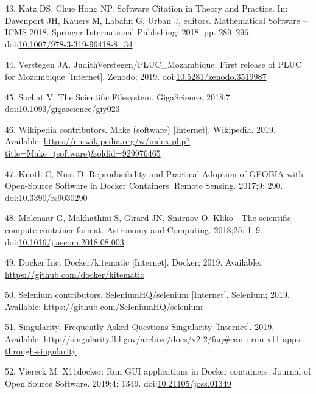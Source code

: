 \documentclass[10pt,letterpaper]{article}
\begin{document}
\leavevmode\hypertarget{ref-katz_software_2018}{}%
43. Katz DS, Chue Hong NP. Software Citation in Theory and Practice. In:
Davenport JH, Kauers M, Labahn G, Urban J, editors. Mathematical
Software -- ICMS 2018. Springer International Publishing; 2018. pp.
289--296.
doi:\href{https://doi.org/10.1007/978-3-319-96418-8_34}{10.1007/978-3-319-96418-8\_34}

\leavevmode\hypertarget{ref-verstegen_pluc_mozambique_2019}{}%
44. Verstegen JA. JudithVerstegen/PLUC\_Mozambique: First release of
PLUC for Mozambique {[}Internet{]}. Zenodo; 2019.
doi:\href{https://doi.org/10.5281/zenodo.3519987}{10.5281/zenodo.3519987}

\leavevmode\hypertarget{ref-sochat_scientific_2018}{}%
45. Sochat V. The Scientific Filesystem. GigaScience. 2018;7.
doi:\href{https://doi.org/10.1093/gigascience/giy023}{10.1093/gigascience/giy023}

\leavevmode\hypertarget{ref-wikipedia_contributors_make_2019}{}%
46. Wikipedia contributors. Make (software) {[}Internet{]}. Wikipedia.
2019. Available:
\url{https://en.wikipedia.org/w/index.php?title=Make_(software)\&oldid=929976465}

\leavevmode\hypertarget{ref-knoth_reproducibility_2017}{}%
47. Knoth C, Nüst D. Reproducibility and Practical Adoption of GEOBIA
with Open-Source Software in Docker Containers. Remote Sensing. 2017;9:
290. doi:\href{https://doi.org/10.3390/rs9030290}{10.3390/rs9030290}

\leavevmode\hypertarget{ref-molenaar_klikoscientific_2018}{}%
48. Molenaar G, Makhathini S, Girard JN, Smirnov O. Kliko---The
scientific compute container format. Astronomy and Computing. 2018;25:
1--9.
doi:\href{https://doi.org/10.1016/j.ascom.2018.08.003}{10.1016/j.ascom.2018.08.003}

\leavevmode\hypertarget{ref-docker_kitematic_2019}{}%
49. Docker Inc. Docker/kitematic {[}Internet{]}. Docker; 2019.
Available: \url{https://github.com/docker/kitematic}

\leavevmode\hypertarget{ref-selenium_2019}{}%
50. Selenium contributors. SeleniumHQ/selenium {[}Internet{]}. Selenium;
2019. Available: \url{https://github.com/SeleniumHQ/selenium}

\leavevmode\hypertarget{ref-singularity_frequently_2019}{}%
51. Singularity. Frequently Asked Questions Singularity {[}Internet{]}.
2019. Available:
\url{http://singularity.lbl.gov/archive/docs/v2-2/faq\#can-i-run-x11-apps-through-singularity}

\leavevmode\hypertarget{ref-viereck_x11docker_2019}{}%
52. Viereck M. X11docker: Run GUI applications in Docker containers.
Journal of Open Source Software. 2019;4: 1349.
doi:\href{https://doi.org/10.21105/joss.01349}{10.21105/joss.01349}
\end{document}
